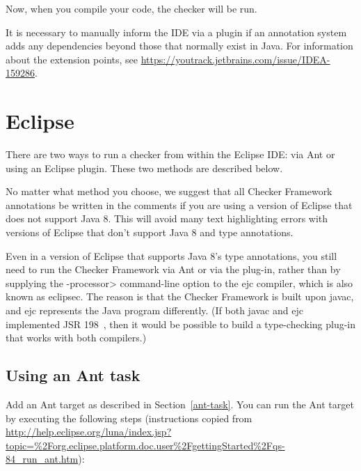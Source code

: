 Now, when you compile your code, the checker will be run.

It is necessary to manually inform the IDE via a plugin if an annotation
system adds any dependencies beyond those that normally exist in Java.
For information about the extension points, see
\url{https://youtrack.jetbrains.com/issue/IDEA-159286}.


\section{Eclipse\label{eclipse}}


There are two ways to run a checker from within the Eclipse IDE:  via Ant
or using an Eclipse plugin.  These two methods are described below.

No matter what method you choose, we suggest that
all Checker Framework annotations be written in the comments
if you are using a version of Eclipse that
does not support Java 8.  This will avoid many
text highlighting errors with versions of Eclipse that don't support Java 8
and type annotations.

Even in a version of Eclipse that supports Java 8's type annotations, you
still need to run the Checker Framework via Ant or via the plug-in, rather
than by supplying the \<-processor> command-line option to the ejc
compiler, which is also known as eclipsec.
The reason is that the Checker Framework is built upon javac,
and ejc represents the Java program differently.  (If both javac and ejc
implemented JSR 198~\cite{JSR198}, then it would be possible to build
a type-checking plug-in that works with both compilers.)


\subsection{Using an Ant task\label{eclipse-ant}}

Add an Ant target as described in Section~\ref{ant-task}.  You can
run the Ant target by executing the following steps
(instructions copied from {\codesize\url{http://help.eclipse.org/luna/index.jsp?topic=%2Forg.eclipse.platform.doc.user%2FgettingStarted%2Fqs-84_run_ant.htm}}):

